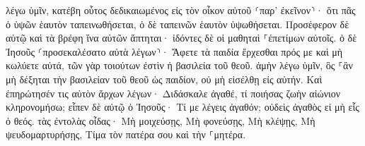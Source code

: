 \documentclass{openreader}
\begin{document}
λέγω ὑμῖν, κατέβη οὗτος δεδικαιωμένος εἰς τὸν οἶκον αὐτοῦ ⸂παρ’ ἐκεῖνον⸃· ὅτι πᾶς ὁ ὑψῶν ἑαυτὸν ταπεινωθήσεται, ὁ δὲ ταπεινῶν ἑαυτὸν ὑψωθήσεται. 
Προσέφερον δὲ αὐτῷ καὶ τὰ βρέφη ἵνα αὐτῶν ἅπτηται· ἰδόντες δὲ οἱ μαθηταὶ ⸀ἐπετίμων αὐτοῖς. 
ὁ δὲ Ἰησοῦς ⸂προσεκαλέσατο αὐτὰ λέγων⸃· Ἄφετε τὰ παιδία ἔρχεσθαι πρός με καὶ μὴ κωλύετε αὐτά, τῶν γὰρ τοιούτων ἐστὶν ἡ βασιλεία τοῦ θεοῦ. 
ἀμὴν λέγω ὑμῖν, ὃς ⸀ἂν μὴ δέξηται τὴν βασιλείαν τοῦ θεοῦ ὡς παιδίον, οὐ μὴ εἰσέλθῃ εἰς αὐτήν. 
Καὶ ἐπηρώτησέν τις αὐτὸν ἄρχων λέγων· Διδάσκαλε ἀγαθέ, τί ποιήσας ζωὴν αἰώνιον κληρονομήσω; 
εἶπεν δὲ αὐτῷ ὁ Ἰησοῦς· Τί με λέγεις ἀγαθόν; οὐδεὶς ἀγαθὸς εἰ μὴ εἷς ὁ θεός. 
τὰς ἐντολὰς οἶδας· Μὴ μοιχεύσῃς, Μὴ φονεύσῃς, Μὴ κλέψῃς, Μὴ ψευδομαρτυρήσῃς, Τίμα τὸν πατέρα σου καὶ τὴν ⸀μητέρα. 
\end{document}
